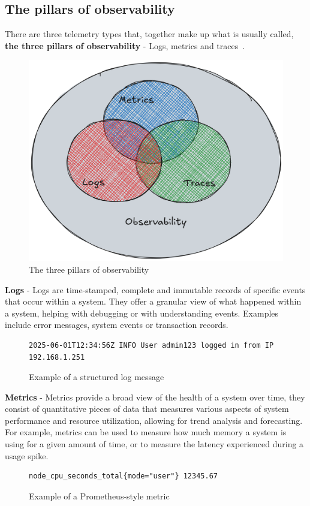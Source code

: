 \subsection{The pillars of observability}\label{subsec:the-pillars-of-observability}
There are three telemetry types that, together make up what is usually called,
\textbf{the three pillars of observability} - Logs, metrics and traces~\cite{ibm_observability}.\\
\begin{figure}[h]
    \centering
    \includegraphics[width=\linewidth, keepaspectratio]{./figures/observability_pillars}
    \caption{The three pillars of observability}
\end{figure}


\textbf{Logs} - Logs are time-stamped, complete and immutable records of specific events that occur within a system.
They offer a granular view of what happened within a system, helping with debugging or with understanding
events.
Examples include error messages, system events or transaction records.\\
\begin{figure}[h]
    \centering
    \begin{lstlisting}
2025-06-01T12:34:56Z INFO User admin123 logged in from IP 192.168.1.251
    \end{lstlisting}
    \caption{Example of a structured log message}
\end{figure}


\textbf{Metrics} - Metrics provide a broad view of the health of a system over time, they consist of quantitative
pieces
of data that
measures various aspects of system performance and resource utilization, allowing for trend analysis and forecasting.
For example, metrics can be used to measure how much memory a system is using for a given amount of time, or to
measure the latency experienced during a usage spike.\\
\begin{figure}[h]
    \centering
    \begin{lstlisting}
node_cpu_seconds_total{mode="user"} 12345.67
    \end{lstlisting}
    \caption{Example of a Prometheus-style metric}
\end{figure}



